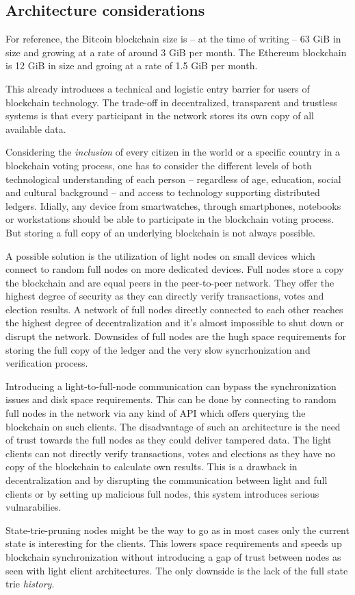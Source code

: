 \documentclass[9pt,oneside]{amsart}
\begin{document}
\begin{multicols}{2}
\subsection{Architecture considerations}
For reference, the Bitcoin blockchain size is -- at the time of writing -- 63 GiB in size and growing at a rate of around 3 GiB per month. The Ethereum blockchain is 12 GiB in size and groing at a rate of 1.5 GiB per month.\par
This already introduces a technical and logistic entry barrier for users of blockchain technology. The trade-off in decentralized, transparent and trustless systems is that every participant in the network stores its own copy of all available data.\par
Considering the \textit{inclusion} of every citizen in the world or a specific country in a blockchain voting process, one has to consider the different levels of both technological understanding of each person -- regardless of age, education, social and cultural background -- and access to technology supporting distributed ledgers. Idially, any device from smartwatches, through smartphones, notebooks or workstations should be able to participate in the blockchain voting process. But storing a full copy of an underlying blockchain is not always possible.\par
A possible solution is the utilization of light nodes on small devices which connect to random full nodes on more dedicated devices. Full nodes store a copy the blockchain and are equal peers in the peer-to-peer network. They offer the highest degree of security as they can directly verify transactions, votes and election results. A network of full nodes directly connected to each other reaches the highest degree of decentralization and it's almost impossible to shut down or disrupt the network. Downsides of full nodes are the hugh space requirements for storing the full copy of the ledger and the very slow syncrhonization and verification process.\par
Introducing a light-to-full-node communication can bypass the synchronization issues and disk space requirements. This can be done by connecting to random full nodes in the network via any kind of API which offers querying the blockchain on such clients. The disadvantage of such an architecture is the need of trust towards the full nodes as they could deliver tampered data. The light clients can not directly verify transactions, votes and elections as they have no copy of the blockchain to calculate own results. This is a drawback in decentralization and by disrupting the communication between light and full clients or by setting up malicious full nodes, this system introduces serious vulnarabilies.\par
State-trie-pruning nodes might be the way to go as in most cases only the current state is interesting for the clients. This lowers space requirements and speeds up blockchain synchronization without introducing a gap of trust between nodes as seen with light client architectures. The only downside is the lack of the full state trie \textit{history}.


\end{multicols}
\end{document}

